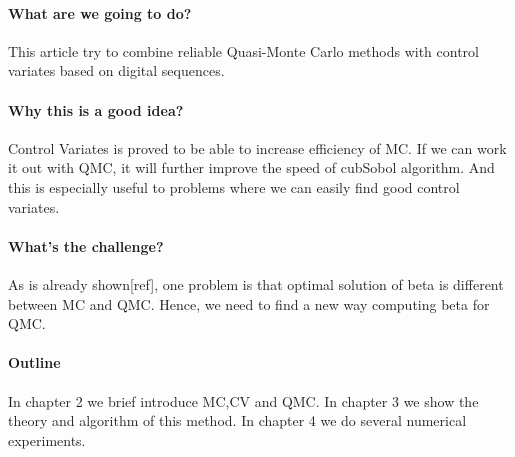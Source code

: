 
\paragraph{What are we going to do?}
This article try to combine reliable Quasi-Monte Carlo methods with control variates based on digital sequences.

\paragraph{Why this is a good idea?} 
Control Variates is proved to be able to increase efficiency of MC. If we can work it out with QMC, it will further improve the speed of cubSobol algorithm. And this is especially useful to problems where we can easily find good control variates.

\paragraph{What's the challenge?}
As is already shown[ref], one problem is that optimal solution of beta is different between MC and QMC. Hence, we need to find a new way computing beta for QMC.
 
\paragraph{Outline}
In chapter 2 we brief introduce MC,CV and QMC.
In chapter 3 we show the theory and algorithm of this method.
In chapter 4 we do several numerical experiments.  
